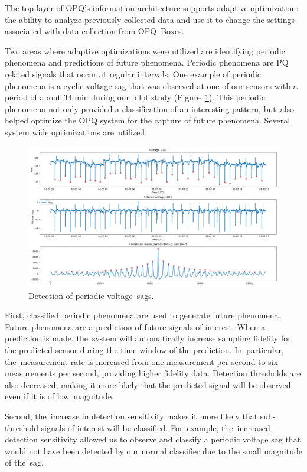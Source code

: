\documentclass[energies,article,accept,moreauthors,pdftex]{Definitions/mdpi}
\begin{document}
The top layer of OPQ's information architecture supports adaptive optimization: the ability to analyze previously collected data and use it to change the settings associated with data collection from OPQ~Boxes.

Two areas where adaptive optimizations were utilized are identifying periodic phenomena and predictions of future phenomena. Periodic phenomena are PQ related signals that occur at regular intervals. One example of periodic phenomena is a cyclic voltage sag that was observed at one of our sensors with a period of about 34 min during our pilot study (Figure~\ref{fig:periodic-voltage-sags}). This periodic phenomena not only provided a classification of an interesting pattern, but~also helped optimize the OPQ system for the capture of future phenomena. Several system wide optimizations are~utilized.

\begin{figure}[H]
\centering
\includegraphics[width=0.90\linewidth]{images/pilot/periodic-voltage-sags.png}
\caption{Detection of periodic voltage~sags.}
\label{fig:periodic-voltage-sags}
\end{figure}

First, classified periodic phenomena are used to generate future phenomena. Future phenomena are a prediction of future signals of interest. When a prediction is made, the~system will automatically increase sampling fidelity for the predicted sensor during the time window of the prediction. In~particular, the~measurement rate is increased from one measurement per second to six measurements per second, providing higher fidelity data. Detection thresholds are also decreased, making it more likely that the predicted signal will be observed even if it is of low~magnitude.

Second, the~increase in detection sensitivity makes it more likely that sub-threshold signals of interest will be classified. For~example, the~increased detection sensitivity allowed us to observe and classify a periodic voltage sag that would not have been detected by our normal classifier due to the small magnitude of the~sag.
\end{document}
